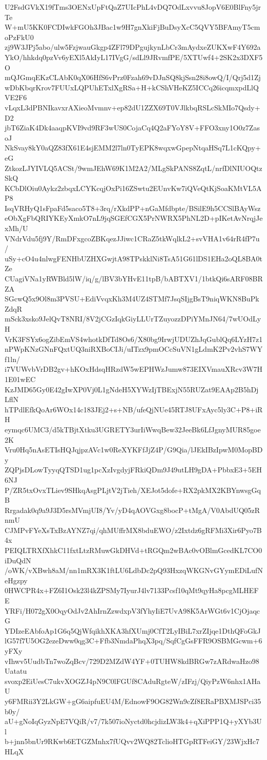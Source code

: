 U2FsdGVkX19fTms3OENxUpFtQaZ7UIcPhL4vDQ7OdLxvvu8JopV6E0BlFny5jrTe
W+mU5KK0FCDIwkFGOh3JBac1w9H7gnXkiFjBuDsyXcC5QVY5BFAmyT5cmoPzFkU0
zj9W3JPj5abo/ulw5FzjwauGkgp4ZFl79DPgujkynLbCr3mAydxeZUKXwF4Y692a
YkO/hhkdq0pzVv6yEXl5AkIyL17IVgG/sdLl9JRvmfPE/5XTUwf4+2SK2x3DXF5O
mQJGmqEKzCLAbK0qX06HfS6vPrz0Fzah69vDJnSQ8kjSsn28i8owQ/I/Qrj5d1Zj
wDbKbqrKrov7FUUxLQPUhETxlXgRSa+H+kCShVHeKZ5ICCq26icqmxpdLlQVE2F6
vLqxL3dPBNIkavxrAXieoMvmnv+ep82dU1ZZX69T0VJlkbqRSLcSkMIo7Qsdy+D2
jbT6ZiaK4Dk4aaqpKVI9vd9RF3wUS0CojaCq4Q2aFYoY8V+FFO3xny1O0z7ZasoJ
NkSvay8kY0aQZ83fX61E4sjEMM2l7ln0TyEPK8wqxwGpepNtqaHSq7L1cKQpy+eG
ZtkozLJYIVLQ5ACSt/9wmJEhW69K1M2A2/MLgSkPANS8ZqtL/nrfDlNIUOQtzSkQ
KCbDlOiu0Aykz2zbqxLCYKcqjOxPi16ZSwtu2EUnvKw7iQVeQtKjSoaKMtVL5AP8
IsqVRHyQ1sFpaFd5saco5T8+3rq/rXkdPP+nGaMfdbpte/BSilE9h5CCSlBAyWsz
eObXgFbQRIYKEyXmkO7nL9jqSGEfCGX5PrNWRX5PhNL2D+pIKetAvNrqjJexMh/U
VNdrVdu5fj9Y/RmDFxgcoZBKqezJJiwc1CRaZ5tkWqlkL2+svVHA1v64rR4fP7u/
uSy+cO4u4nlwgFENHbUZHXGwjtA98TPskklNi8TsA51G61lDS1EHa2oQL8BA0tZe
CUagiVNa1yRWBld5lW/iq/g/lBV3bYHvE11tpB/bABTXV1/1btkQi6sARF08BRZA
SGcwQ5x9Ol8m3PVSU+EdiVvqxKh3M4UZ4STMf7JsqSIjgBsT9niqWKN8BuPkZdqR
mSck3xsko9JelQvT8NRI/8V2jCGzIqkGiyLLUrTZuyozzDPiYMnJN64/7wUOdLyH
VrK3FSYx6ogZibEmVS4whotkDfTd8Os6/X80bg9IrwjUDUZhJqGublQq6LYzH7z1
nPWpKNzGNnFQxtUQ3niRXBoCIJi/uITzx9pmOCcSuVN1gLdmK2Pv2vhS7WYf1ln/
i7VUWvbVrDB2gv+hKOxHdsqHRzdW5wEPHWzJumw873EIXVmauXRcv3W7H1E01wEC
KzJMD65Gy0E42gIwXP0Vj0L1gNdeH5XYWzIjTBExjN55RUZat9EAAp2B5hDjLflN
hTPdlEfkQoAr6WOx14c183JEj2+s+NB/ufeQjNUe45RTJ8UFxAyc5ly3C+P8+iRH
eymqc6UMC3/d5kTBjtXtku3UGRETY3urIiWwqBew32JeeBk6LfJgnyMUR85goe2K
Vru0Hq5nAsETIsHQJqjpzAVc1w0ReXYKFfJjZ4P/G9Qia/lJEkIBzIpwM0MopBDy
ZQPjsDLowTyyqQTSD1ug1pcXzIvgdyjFRkiQDm9J49utLH9gDA+PbbxE3+5EH6NJ
P/ZR5txOvxTLiev9SHkqAsgPLjtV2jTieh/XEJot5dofe+RX2pkMX2KBYnwsgGqB
Rrgadak0q9a9J3D5rsMVmjUI8/Yv/yD4qAOVGxg8bocP+tMgA/V0AbdUQ05zRnmU
CJMPvFYeXsTxBzAYNZ7qi/qhMUffrMX8bduEWO/z2Ixtdz6gRFMi3Xir6Pyo7B4x
PEIQLTRXfXhkC11fxtLtzRMuwGkDHVd+tRGQm2wBAc0vOBlmGcedKL7CO0iDuQdN
/oWK/vXBwh8aM/nn1mRX3K1ftLU6LdbDc2pQ93HxzqWKGNvGYymEDiLufNeHgzpy
0HWCPR4x+FZ6I1Osk23l4kZPSMy7IyurJ4lv7133Pcsf10qMt9qyHa8pcgMLHEFE
YRFi/H072gX0OqyOdJv2AhIrnZzwdxpV3fYhyIiE7UvA98K5ArWGt6v1CjOjaqcG
YDIzeEAbfoAp1G6q5QjWfqikhXKA3hfXUmj0CfT2LyIBiL7xrZIjqe1DthQFoGkJ
lG57f7U5OG2ezeDww0qg3C+Ffb3NmdaPhqX3pq/SqfCgGsFFR9OSBMGcwm+6yFXy
vIhwv5UudbTn7woZqBcv/729D2MZdW4YF+0TUHW8kdBRGw7zARdwaHzo98Uatatu
svoxp2EiUesC7ukvXOGZJ4pN9C0lFGUf8CAduRgteW/zIFzj/QiyPzW6nhx1AHaU
y6FMRii3Y2LkGW+gG6aipfuEU4M/EdnowF9OG82Wn9cZf8ERaPBXMJSPci35b0y/
aU+gNoIqGyzNpE7VQiR/v7/7k507ioNyctd0hcjdizLW3k4+qXiPPP1Q+yXYb3Ul
b+jnn5bnUr9RKwb6ETGZMnhx7fUQvv2WQ82TclioHTGpRTFeiGY/23WjxHc7HLqX
